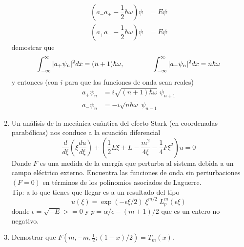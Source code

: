 \begin{enumerate}
\begin{align*}
(a_{-} a_{+} - \dfrac{1}{2} \hbar \omega) \psi &= E \psi \nonumber \\
(a_{+} a_{-} - \dfrac{1}{2} \hbar \omega) \psi &= E \psi \nonumber
\end{align*}
demostrar que
\[ \int_{-\infty}^{\infty} \vert a_{+} \psi_{n} \vert^{2} dx = (n+1) \hbar \omega, \hspace{1.5cm} \int_{-\infty}^{\infty} \vert a_{-} \psi_{n} \vert^{2} dx = n\hbar \omega \]
y entonces (con $i$ para que las funciones de onda sean reales)
\begin{align*}
a_{+} \psi_{n} &= i \sqrt{(n+1) \hbar \omega} \; \psi_{n+1} \nonumber \\
a_{-} \psi_{n} &= -i \sqrt{n \hbar \omega} \; \psi_{n-1} \nonumber
\end{align*}
\item Un análisis de la mecánica cuántica del efecto Stark (en coordenadas parabólicas) nos conduce a la ecuación diferencial
\[  \dfrac{d}{d \xi} \left( \xi \dfrac{du}{d \xi} \right) + \left( \dfrac{1}{2} E \xi + L - \dfrac{m^{2}}{4 \xi} - \dfrac{1}{4} F \xi^{2} \right) u =0 \]
Donde $F$ es una medida de la energía que perturba al sistema debida a un campo eléctrico externo. Encuentra las funciones de onda sin perturbaciones $(F=0)$ en términos de los polinomios asociados de Laguerre.
\\
Tip: a lo que tienes que llegar es a un resultado del tipo
\[ u(\xi) = \exp(- \epsilon \xi /2) \; \xi^{m/2} \; L_{p}^{m} (\epsilon \xi)  \]
donde $\epsilon = \sqrt{-E} > = 0$ y $p = \alpha / \epsilon - (m+1) / 2$ que es un entero no negativo.
\item Demostrar que $F(m, -m, \frac{1}{2}; (1-x)/2) = T_{m}(x)$.
\end{enumerate}
%
